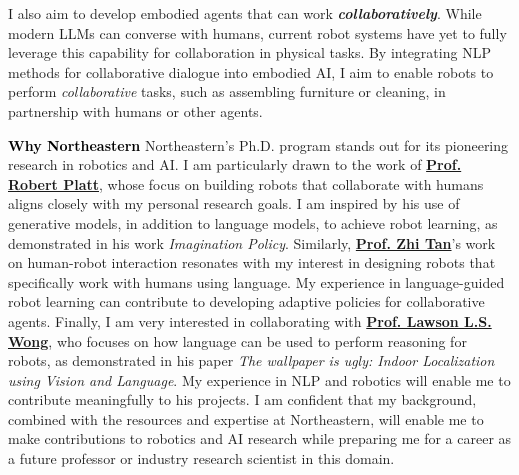 \documentclass[12pt]{article}
\newcommand{\statement}[1]{\medskip\noindent
  \textcolor{black}{\textbf{#1}}\space
}
\begin{document}
\noindent I also aim to develop embodied agents that can work \textbf{\textit{collaboratively}}. While modern LLMs can converse with humans, current robot systems have yet to fully leverage this capability for collaboration in physical tasks. By integrating NLP methods for collaborative dialogue into embodied AI, I aim to enable robots to perform \textit{collaborative} tasks, such as assembling furniture or cleaning, in partnership with humans or other agents.

\statement{Why Northeastern} Northeastern's Ph.D. program stands out for its pioneering research in robotics and AI. I am particularly drawn to the work of \href{https://www2.ccs.neu.edu/research/helpinghands/group.html}{\textbf{Prof. Robert Platt}}, whose focus on building robots that collaborate with humans aligns closely with my personal research goals. I am inspired by his use of generative models, in addition to language models, to achieve robot learning, as demonstrated in his work \textit{Imagination Policy}. Similarly, \href{https://zhi.fyi/}{\textbf{Prof. Zhi Tan}}'s work on human-robot interaction resonates with my interest in designing robots that specifically work with humans using language. My experience in language-guided robot learning can contribute to developing adaptive policies for collaborative agents. Finally, I am very interested in collaborating with \href{https://www.khoury.northeastern.edu/home/lsw/}{\textbf{Prof. Lawson L.S. Wong}}, who focuses on how language can be used to perform reasoning for robots, as demonstrated in his paper \textit{The wallpaper is ugly: Indoor Localization using Vision and Language}. My experience in NLP and robotics will enable me to contribute meaningfully to his projects. I am confident that my background, combined with the resources and expertise at Northeastern, will enable me to make contributions to robotics and AI research while preparing me for a career as a future professor or industry research scientist in this domain.
\end{document}
